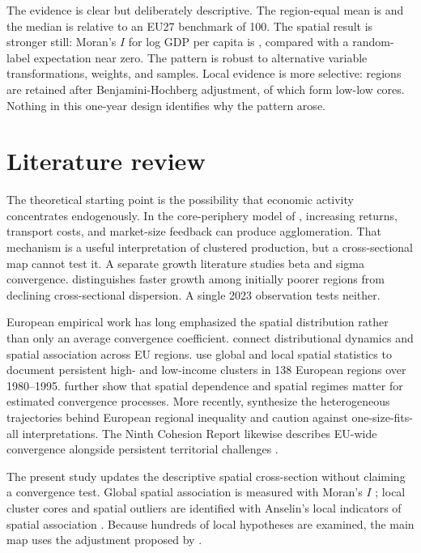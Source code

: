 \documentclass[11pt,a4paper]{article}
\begin{document}
The evidence is clear but deliberately descriptive. The region-equal mean is
\MeanGDP{} and the median is \MedianGDP{} relative to an EU27 benchmark of
100. The spatial result is stronger still: Moran's $I$ for log GDP per capita is
\MoranI{}, compared with a random-label expectation near zero. The pattern is
robust to alternative variable transformations, weights, and samples. Local
evidence is more selective: \LISAFDRTotal{} regions are retained after
Benjamini-Hochberg adjustment, of which \LISALL{} form low-low cores. Nothing in
this one-year design identifies why the pattern arose.

\section{Literature review}

The theoretical starting point is the possibility that economic activity
concentrates endogenously. In the core-periphery model of \citet{krugman1991},
increasing returns, transport costs, and market-size feedback can produce
agglomeration. That mechanism is a useful interpretation of clustered
production, but a cross-sectional map cannot test it. A separate growth
literature studies beta and sigma convergence. \citet{salaimartin1996}
distinguishes faster growth among initially poorer regions from declining
cross-sectional dispersion. A single 2023 observation tests neither.

European empirical work has long emphasized the spatial distribution rather
than only an average convergence coefficient. \citet{lopezbazo1999} connect
distributional dynamics and spatial association across EU regions.
\citet{legalloertur2003} use global and local spatial statistics to document
persistent high- and low-income clusters in 138 European regions over
1980--1995. \citet{ertur2006} further show that spatial dependence and spatial
regimes matter for estimated convergence processes. More recently,
\citet{iammarino2019} synthesize the heterogeneous trajectories behind
European regional inequality and caution against one-size-fits-all
interpretations. The Ninth Cohesion Report likewise describes EU-wide
convergence alongside persistent territorial challenges
\citep{ec2024cohesion}.

The present study updates the descriptive spatial cross-section without
claiming a convergence test. Global spatial association is measured with
Moran's $I$ \citep{moran1950}; local cluster cores and spatial outliers are
identified with Anselin's local indicators of spatial association
\citep{anselin1995}. Because hundreds of local hypotheses are examined, the
main map uses the adjustment proposed by \citet{benjaminihochberg1995}.
\end{document}
